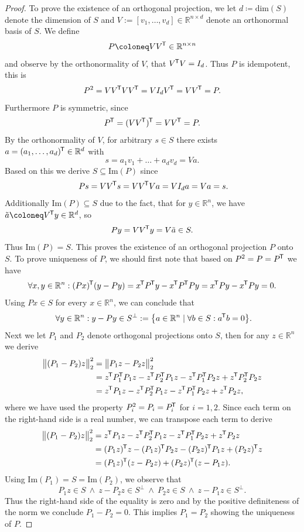 \documentclass[11pt, a4paper]{article}
\newcommand{\R}{\mathbb{R}}
\newcommand*{\tr}{^{\mkern-1.5mu\mathsf{T}}}
\begin{document}
\begin{proof}
To prove the existence of an orthogonal projection, we let $d \coloneq \text{dim}(S)$ denote the dimension of $S$ and $V := [v_1, \dots, v_d] \in \R^{n \times d}$ denote an orthonormal basis of $S$. We define
\[ P \coloneq VV\tr  \in \R^{n \times n} \]
and observe by the orthonormality of $V$, that $V\tr V = I_d$. Thus $P$ is idempotent, this is
\[ P^2 = VV\tr  VV\tr  = V I_d V\tr  = VV\tr  = P. \]
Furthermore $P$ is symmetric, since 
\[ P\tr  = (VV\tr )\tr  = VV\tr  = P. \]
By the orthonormality of $V$, for arbitrary $s \in S$ there exists $a = (a_1, \dots, a_d)\tr  \in \R^d$ with
\[ s = a_1v_1 + \dots + a_dv_d = Va. \]
Based on this we derive $S \subseteq \text{Im}(P)$ since
\[ Ps = VV\tr s = VV\tr Va = VI_da = Va =s. \]
Additionally $\text{Im}(P) \subseteq S$ due to the fact, that for $y \in \R^n$, we have $\tilde{a} \coloneq V\tr y \in \R^d$, so
\[ Py = VV\tr y = V\tilde{a} \in S. \]
Thus $\text{Im}(P) = S$. This proves the existence of an orthogonal projection $P$ onto $S$. To prove uniqueness of $P$, we should first note that based on $P^2 = P = P\tr $ we have
\[ \forall x,y \in \R^n : (Px)\tr (y-Py) = x\tr P\tr y - x\tr P\tr Py = x\tr Py - x\tr Py = 0. \]
Using $Px \in S$ for every $x \in \R^n$, we can conclude that 
\[ \forall y \in \R^n : y - Py \in S^\perp := \big \{ a \in \R^n \mid \forall b \in S : a\tr b = 0 \big \}. \]
Next we let $P_1$ and $P_2$ denote orthogonal projections onto $S$, then for any $z \in \R^n$ we derive
\[ \begin{split}
\big \| (P_1-P_2)z \big \|_2^2 
&= \big \| P_1z -P_2z \big \|_2^2 \\\
&= z\tr P_1\tr P_1z - z\tr P_2\tr P_1z -  z\tr P_1\tr P_2z + z\tr P_2\tr P_2z \\\
&= z\tr P_1z - z\tr P_2\tr P_1z -  z\tr P_1\tr P_2z + z\tr P_2z,
\end{split} \]
where we have used the property $P_i^2 = P_i = P_i\tr $ for $i=1,2$. Since each term on the right-hand side is a real number, we can transpose each term to derive
\[ \begin{split}
\big \| (P_1-P_2)z \big \|_2^2 
&=  z\tr P_1z - z\tr P_2\tr P_1z -  z\tr P_1\tr P_2z + z\tr P_2z \\\
&= (P_1z)\tr z - (P_1z)\tr P_2z - (P_2z)\tr P_1z + (P_2z)\tr z \\\
&= (P_1z)\tr (z-P_2z) + (P_2z)\tr (z-P_1z).
\end{split} \] 
Using $\text{Im}(P_1) = S = \text{Im}(P_2)$, we observe that 
\[ P_1z \in S \ \wedge \ z-P_2z \in S^\perp \ \wedge \ P_2z \in S \ \wedge \ z - P_1z \in S^\perp. \]
Thus the right-hand side of the equality is zero and by the positive definiteness of the norm we conclude $P_1 - P_2 = 0$. This implies $P_1 = P_2$ showing the uniqueness of $P$.
\end{proof}
\end{document}
